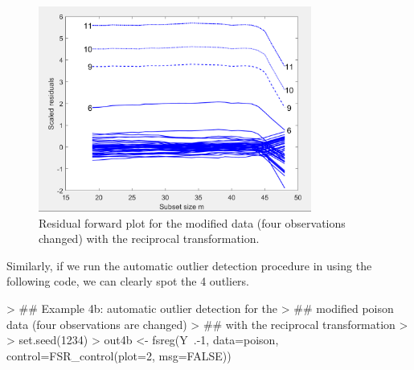 \documentclass[article,shortnames,nojss]{jss}
\begin{document}
\begin{center}
\begin{figure}[H]
\includegraphics[width=0.8\textwidth]{transreg-ex-4a.png}
\caption{Residual forward plot for the modified  data (four observations changed) with the reciprocal transformation.}
\label{fig:ex-4a}
\end{figure}
\end{center}


Similarly, if we run the automatic outlier detection procedure in  using the following code, we can clearly spot the 4 outliers.

\begin{Schunk}
\begin{Sinput}
> ##  Example 4b: automatic outlier detection for the
> ##  modified poison data (four observations are changed)
> ##  with the reciprocal transformation
> 
> set.seed(1234)
> out4b <- fsreg(Y~.-1, data=poison, control=FSR_control(plot=2, msg=FALSE))
\end{Sinput}
\end{Schunk}
\end{document}
